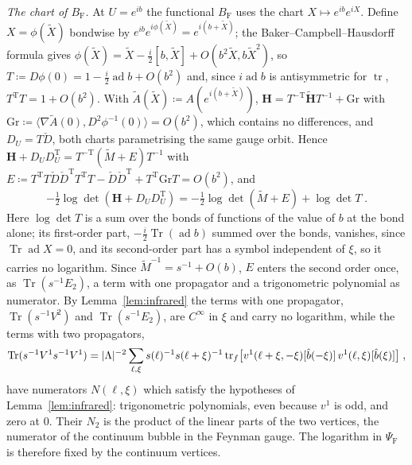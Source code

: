 \documentclass[11pt]{preprint}
\newcommand{\tr}{\operatorname{tr}}
\DeclarePairedDelimiter{\abs}{\lvert}{\rvert}
\numberwithin{equation}{section}
\theoremstyle{definition}
\theoremstyle{remark}
\theoremstyle{plain}
\begin{document}
\emph{The chart of $B_{\mathrm F}$.} At $U = e^{ib}$ the functional $B_{\mathrm F}$ uses the chart $X \mapsto e^{ib}e^{iX}$. Define $X = \phi(\tilde X)$ bondwise by $e^{ib}e^{i\phi(\tilde X)} = e^{i(b+\tilde X)}$; the Baker--Campbell--Hausdorff formula gives $\phi(\tilde X) = \tilde X - \frac i2[b, \tilde X] + O(b^2\tilde X, b\tilde X^2)$, so $T \coloneqq D\phi(0) = 1 - \frac i2\operatorname{ad}b + O(b^2)$ and, since $i\operatorname{ad}b$ is antisymmetric for $\tr$, $T^{\mathrm T}T = 1 + O(b^2)$. With $\tilde A(\tilde X) \coloneqq A(e^{i(b+\tilde X)})$, $\mathbf H = T^{-\mathrm T}\tilde{\mathbf H}T^{-1} + \mathrm{Gr}$ with $\mathrm{Gr} \coloneqq \langle\nabla\tilde A(0), D^2\phi^{-1}(0)\rangle = O(b^2)$, which contains no differences, and $D_U = T\check D$, both charts parametrising the same gauge orbit. Hence $\mathbf H + D_UD_U^{\mathrm T} = T^{-\mathrm T}(\tilde M + E)T^{-1}$ with $E \coloneqq T^{\mathrm T}T\check D\check D^{\mathrm T}T^{\mathrm T}T - \check D\check D^{\mathrm T} + T^{\mathrm T}\mathrm{Gr}T = O(b^2)$, and
\begin{equation}\label{eq:chart-change}
    -\tfrac12\log\det(\mathbf H + D_UD_U^{\mathrm T}) = -\tfrac12\log\det(\tilde M + E) + \log\det T\;.
\end{equation}
Here $\log\det T$ is a sum over the bonds of functions of the value of $b$ at the bond alone; its first-order part, $-\frac i2\operatorname{Tr}(\operatorname{ad}b)$ summed over the bonds, vanishes, since $\operatorname{Tr}\operatorname{ad}X = 0$, and its second-order part has a symbol independent of $\xi$, so it carries no logarithm. Since $\tilde M^{-1} = s^{-1} + O(b)$, $E$ enters the second order once, as $\operatorname{Tr}(s^{-1}E_2)$, a term with one propagator and a trigonometric polynomial as numerator. By Lemma~\ref{lem:infrared} the terms with one propagator, $\operatorname{Tr}(s^{-1}V^2)$ and $\operatorname{Tr}(s^{-1}E_2)$, are $C^\infty$ in $\xi$ and carry no logarithm, while the terms with two propagators,
\begin{equation}\label{eq:bubble}
    \operatorname{Tr}(s^{-1}V^1s^{-1}V^1) = \abs{\Lambda}^{-2}\sum_{\ell,\xi}s(\ell)^{-1}s(\ell + \xi)^{-1}\operatorname{tr}_f\bigl[v^1(\ell + \xi, -\xi)[\hat b(-\xi)]\,v^1(\ell, \xi)[\hat b(\xi)]\bigr]\;,
\end{equation}
have numerators $N(\ell, \xi)$ which satisfy the hypotheses of Lemma~\ref{lem:infrared}: trigonometric polynomials, even because $v^1$ is odd, and zero at $0$. Their $N_2$ is the product of the linear parts of the two vertices, the numerator of the continuum bubble in the Feynman gauge. The logarithm in $\Psi_{\mathrm F}$ is therefore fixed by the continuum vertices.
\end{document}
